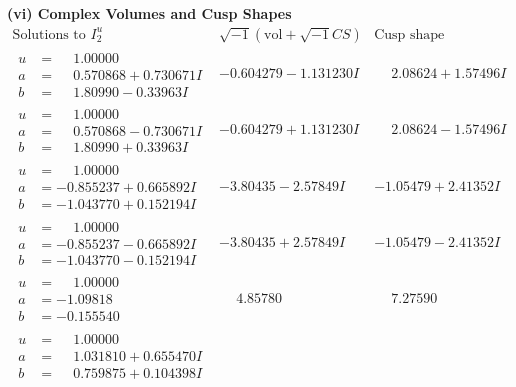 \documentclass[1p]{elsarticle_modified}
\theoremstyle{definition}
\newcommand{\I}{\sqrt{-1}}
\begin{document}
\newpage\flushleft \textbf{(vi) Complex Volumes and Cusp Shapes}
$$\begin{array}{c|c|c}  
\text{Solutions to }I^u_{2}& \I (\text{vol} + \sqrt{-1}CS) & \text{Cusp shape}\\
 \hline 
\begin{aligned}
u &= \phantom{-}1.00000\phantom{ +0.000000I} \\
a &= \phantom{-}0.570868 + 0.730671 I \\
b &= \phantom{-}1.80990 - 0.33963 I\end{aligned}
 & -0.604279 - 1.131230 I & \phantom{-}2.08624 + 1.57496 I \\ \hline\begin{aligned}
u &= \phantom{-}1.00000\phantom{ +0.000000I} \\
a &= \phantom{-}0.570868 - 0.730671 I \\
b &= \phantom{-}1.80990 + 0.33963 I\end{aligned}
 & -0.604279 + 1.131230 I & \phantom{-}2.08624 - 1.57496 I \\ \hline\begin{aligned}
u &= \phantom{-}1.00000\phantom{ +0.000000I} \\
a &= -0.855237 + 0.665892 I \\
b &= -1.043770 + 0.152194 I\end{aligned}
 & -3.80435 - 2.57849 I & -1.05479 + 2.41352 I \\ \hline\begin{aligned}
u &= \phantom{-}1.00000\phantom{ +0.000000I} \\
a &= -0.855237 - 0.665892 I \\
b &= -1.043770 - 0.152194 I\end{aligned}
 & -3.80435 + 2.57849 I & -1.05479 - 2.41352 I \\ \hline\begin{aligned}
u &= \phantom{-}1.00000\phantom{ +0.000000I} \\
a &= -1.09818\phantom{ +0.000000I} \\
b &= -0.155540\phantom{ +0.000000I}\end{aligned}
 & \phantom{-}4.85780\phantom{ +0.000000I} & \phantom{-}7.27590\phantom{ +0.000000I} \\ \hline\begin{aligned}
u &= \phantom{-}1.00000\phantom{ +0.000000I} \\
a &= \phantom{-}1.031810 + 0.655470 I \\
b &= \phantom{-}0.759875 + 0.104398 I\end{aligned}

\end{array}$$
\end{document}
